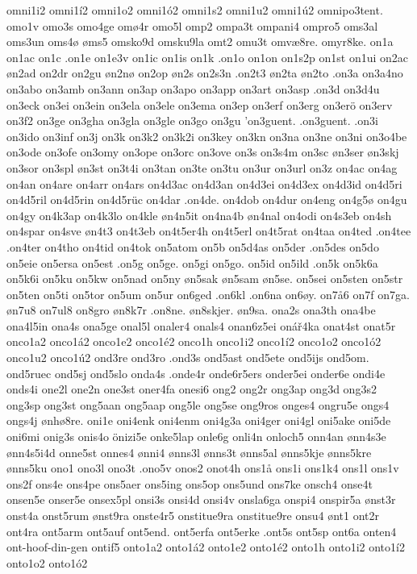 {{omni1i2
omni1í2
omni1o2
omni1ó2
omni1s2
omni1u2
omni1ú2
omnipo3tent.
omo1v
omo3s
omo4ge
omø4r
omo5l
omp2
ompa3t
ompani4
ompro5
oms3al
oms3un
oms4ø
øms5
omsko9d
omsku9la
omt2
omu3t
omvæ8re.
omyr8ke.
on1a
on1ac
on1c
.on1e
on1e3v
on1ic
on1is
on1k
.on1o
on1on
on1s2p
on1st
on1ui
on2ac
øn2ad
on2dr
on2gu
øn2nø
on2op
øn2s
on2s3n
.on2t3
øn2ta
øn2to
.on3a
on3a4no
on3abo
on3amb
on3ann
on3ap
on3apo
on3app
on3art
on3asp
.on3d
on3d4u
on3eck
on3ei
on3ein
on3ela
on3ele
on3ema
on3ep
on3erf
on3erg
on3erö
on3erv
on3f2
on3ge
on3gha
on3gla
on3gle
on3go
on3gu
'on3guent.
.on3guent.
.on3i
on3ido
on3inf
on3j
on3k
on3k2
on3k2i
on3key
on3kn
on3na
on3ne
on3ni
on3o4be
on3ode
on3ofe
on3omy
on3ope
on3orc
on3ove
on3s
on3s4m
on3sc
øn3ser
øn3skj
on3sor
on3spl
øn3st
on3t4i
on3tan
on3te
on3tu
on3ur
on3url
on3z
on4ac
on4ag
on4an
on4are
on4arr
on4ars
on4d3ac
on4d3an
on4d3ei
on4d3ex
on4d3id
on4d5ri
on4d5ril
on4d5rin
on4d5rüc
on4dar
.on4de.
on4dob
on4dur
on4eng
on4g5ø
on4gu
on4gy
on4k3ap
on4k3lo
on4kle
øn4n5it
on4na4b
øn4nal
on4odi
on4s3eb
on4sh
on4spar
on4sve
øn4t3
on4t3eb
on4t5er4h
on4t5erl
on4t5rat
on4taa
on4ted
.on4tee
.on4ter
on4tho
on4tid
on4tok
on5atom
on5b
on5d4as
on5der
.on5des
on5do
on5eie
on5ersa
on5est
.on5g
on5ge.
on5gi
on5go.
on5id
on5ild
.on5k
on5k6a
on5k6i
on5ku
on5kw
on5nad
on5ny
øn5sak
øn5sam
øn5se.
on5sei
on5sten
on5str
on5ten
on5ti
on5tor
on5um
on5ur
on6ged
.on6kl
.on6na
on6øy.
on7å6
on7f
on7ga.
øn7u8
on7ul8
on8gro
øn8k7r
.on8ne.
øn8skjer.
øn9sa.
ona2s
ona3th
ona4be
ona4l5in
ona4s
ona5ge
onal5l
onaler4
onals4
onan6z5ei
onář4ka
onat4st
onat5r
onco1a2
onco1á2
onco1e2
onco1é2
onco1h
onco1i2
onco1í2
onco1o2
onco1ó2
onco1u2
onco1ú2
ond3re
ond3ro
.ond3s
ond5ast
ond5ete
ond5ijs
ond5om.
ond5ruec
ond5sj
ond5slo
onda4s
.onde4r
onde6r5ers
onder5ei
onder6e
ondi4e
onds4i
one2l
one2n
one3st
oner4fa
onesi6
ong2
ong2r
ong3ap
ong3d
ong3s2
ong3sp
ong3st
ong5aan
ong5aap
ong5le
ong5se
ong9ros
onges4
ongru5e
ongs4
ongs4j
ønhø8re.
oni1e
oni4enk
oni4enm
oni4g3a
oni4ger
oni4gl
oni5ake
oni5de
oni6mi
onig3s
onis4o
önizi5e
onke5lap
onle6g
onli4n
onloch5
onn4an
ønn4s3e
ønn4s5i4d
onne5st
onnes4
ønni4
ønns3l
ønns3t
ønns5al
ønns5kje
ønns5kre
ønns5ku
ono1
ono3l
ono3t
.ono5v
onos2
onot4h
ons1å
ons1i
ons1k4
ons1l
ons1v
ons2f
ons4e
ons4pe
ons5aer
ons5ing
ons5op
ons5und
ons7ke
onsch4
onse4t
onsen5e
onser5e
onsex5pl
onsi3s
onsi4d
onsi4v
onsla6ga
onspi4
onspir5a
ønst3r
onst4a
onst5rum
ønst9ra
onste4r5
onstitue9ra
onstitue9re
onsu4
ønt1
ont2r
ont4ra
ont5arm
ont5auf
ont5end.
ont5erfa
ont5erke
.ont5s
ont5sp
ont6a
onten4
ont-hoof-din-gen
ontif5
onto1a2
onto1á2
onto1e2
onto1é2
onto1h
onto1i2
onto1í2
onto1o2
onto1ó2
}}
